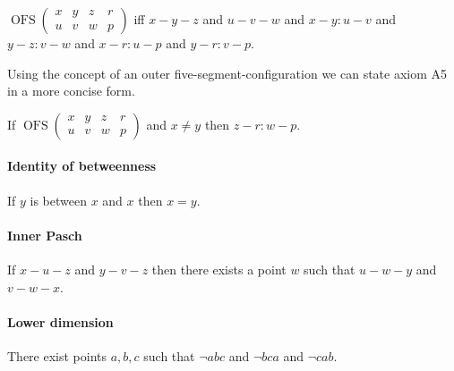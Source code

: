 \documentclass{article}
\newcommand{\NotBetw}[3]{\lnot #1 #2 #3}
\newcommand{\OFS}[8]{\operatorname{OFS}
\left(\begin{smallmatrix}%
#1 & #2 & #3 & #4 \\
#5 & #6 & #7 & #8
\end{smallmatrix}\right)%
}
\begin{document}
  \begin{forthel}
    \begin{definition}[OFS]
      $\OFS{x}{y}{z}{r}{u}{v}{w}{p}$ iff $x-y-z$ and $u-v-w$ and $x-y : u-v$ and $y-z : v-w$ and $x-r : u-p$ and $y-r : v-p$.
    \end{definition}
  \end{forthel}

  Using the concept of an outer five-segment-configuration we can state axiom A5 in a more concise form.

  \begin{forthel}
  \begin{axiom}[A5]
    If $\OFS{x}{y}{z}{r}{u}{v}{w}{p}$ and $x \neq y$ then $z-r : w-p$.
  \end{axiom}
  \end{forthel}


  \paragraph{Identity of betweenness}

  \begin{forthel}
    \begin{axiom}[A6]
      If $y$ is between $x$ and $x$ then $x = y$.
    \end{axiom}
  \end{forthel}


  \paragraph{Inner Pasch}

  \begin{forthel}
    \begin{axiom}[A7]
      If $x-u-z$ and $y-v-z$ then there exists a point $w$ such that $u-w-y$ and $v-w-x$.
    \end{axiom}
  \end{forthel}


  \paragraph{Lower dimension}

  \begin{forthel}
    \begin{axiom}[A8]
      There exist points $a,b,c$ such that
      $\NotBetw{a}{b}{c}$ and $\NotBetw{b}{c}{a}$ and $\NotBetw{c}{a}{b}$.
    \end{axiom}
  \end{forthel}
\end{document}
